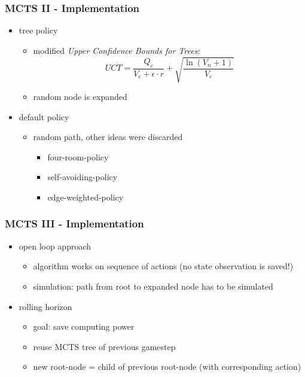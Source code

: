 \documentclass{beamer}
\begin{document}
\begin{frame}
\frametitle{MCTS II - Implementation}
\begin{itemize}
 \item tree policy
 \begin{itemize}
 	\item modified \textit{Upper Confidence Bounds for Trees}:
 	\begin{equation}
 		UCT = \frac{Q_c}{V_c + \epsilon \cdot r} + \sqrt{\frac{\ln{(V_n +1)}}{V_c}}
 	\end{equation}
 	\item random node is expanded
 \end{itemize}
 	\item default policy
 	\begin{itemize}
 		\item random path, other ideas were discarded
 		\begin{itemize}
 			\item four-room-policy
 			\item self-avoiding-policy
 			\item edge-weighted-policy
 		\end{itemize}
 	\end{itemize}

 \end{itemize}

\end{frame}

\begin{frame}
\frametitle{MCTS III - Implementation}
\begin{itemize}
\item open loop approach
 	\begin{itemize}
 		\item algorithm works on sequence of actions (no state observation is saved!)
 		\item simulation: path from root to expanded node has to be simulated
 	\end{itemize}
 	\item rolling horizon
 	\begin{itemize}
 		\item goal: save computing power
 		\item reuse MCTS tree of previous gamestep
 		\item new root-node = child of previous root-node (with corresponding action)
 	\end{itemize}
\end{itemize}
\end{frame}
\end{document}
